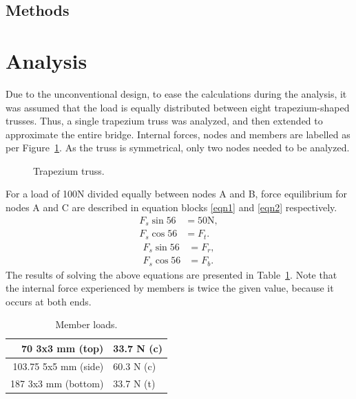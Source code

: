 \documentclass[12pt]{article}
\begin{document}
		\subsection{Methods}
	\section{Analysis}
		Due to the unconventional design, to ease the calculations during the analysis, it was assumed that the load is equally distributed between eight trapezium-shaped trusses. Thus, a single trapezium truss was analyzed, and then extended to approximate the entire bridge. Internal forces, nodes and members are labelled as per Figure~\ref{trap}. As the truss is symmetrical, only two nodes needed to be analyzed.
		\begin{figure}[h!]
			\centering
			\caption{Trapezium truss.}
			\label{trap}
		\end{figure}
		For a load of 100N divided equally between nodes A and B, force equilibrium for nodes A and C are described in equation blocks \ref{eqn1} and \ref{eqn2} respectively.
		\begin{subequations}
			\begin{align}
				F_s \sin 56&=50\mathrm{N}, \\
				F_s \cos 56&=F_t.
			\end{align} \label{eqn1}
		\end{subequations}
		\begin{subequations}
			\begin{align}
				F_s \sin 56&=F_r, \\ 
				F_s \cos 56&=F_b.
			\end{align} \label{eqn2}
		\end{subequations}
		The results of solving the above equations are presented in Table~\ref{loads}. Note that the internal force experienced by members is twice the given value, because it occurs at both ends.
		\begin{table}[h!]
			\caption{Member loads.}
			\begin{center}
			\begin{tabular}{ | r | l | }
				\hline
				70 3x3 mm (top) & 33.7 N (c) \\ \hline
				103.75 5x5 mm (side) & 60.3 N (c) \\ \hline
				187 3x3 mm (bottom) & 33.7 N (t) \\ \hline
			\end{tabular}
			\end{center}
			\label{loads}
		\end{table}
\end{document}
